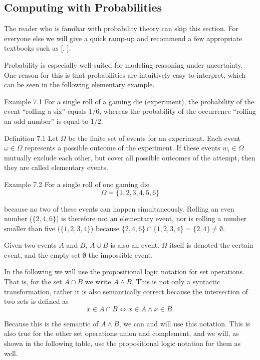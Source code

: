 \documentclass[10pt]{book}
\begin{document}
\subsection{Computing with Probabilities}
The reader who is familiar with probability theory can skip this section. For everyone else we will give a quick ramp-up and recommend a few appropriate textbooks such as [\cite{ross2009introprob}, \cite{freedman2007statistics}].

Probability is especially well-suited for modeling reasoning under uncertainty. One reason for this is that probabilities are intuitively easy to interpret, which can be seen in the following elementary example.

Example 7.1 For a single roll of a gaming die (experiment), the probability of the event ``rolling a six'' equals $1/6$, whereas the probability of the occurrence ``rolling an odd number'' is equal to $1/2$.

Definition 7.1 Let $\Omega$ be the finite set of events for an experiment. Each event $\omega \in \Omega$ represents a possible outcome of the experiment. If these events $w_{i} \in \Omega$ mutually exclude each other, but cover all possible outcomes of the attempt, then they are called elementary events.

Example 7.2 For a single roll of one gaming die
$$
\Omega=\{1,2,3,4,5,6\}
$$

because no two of these events can happen simultaneously. Rolling an even number ($\{2,4,6\}$) is therefore not an elementary event, nor is rolling a number smaller than five ($\{1,2,3,4\}$) because $\{2,4,6\} \cap \{1,2,3,4\}=\{2,4\} \neq \emptyset$.

Given two events $A$ and $B$, $A \cup B$ is also an event. $\Omega$ itself is denoted the certain event, and the empty set $\emptyset$ the impossible event.

In the following we will use the propositional logic notation for set operations. That is, for the set $A \cap B$ we write $A \wedge B$. This is not only a syntactic transformation, rather it is also semantically correct because the intersection of two sets is defined as
$$
x \in A \cap B \Leftrightarrow x \in A \wedge x \in B .
$$

Because this is the semantic of $A \wedge B$, we can and will use this notation. This is also true for the other set operations union and complement, and we will, as shown in the following table, use the propositional logic notation for them as well.
\end{document}
